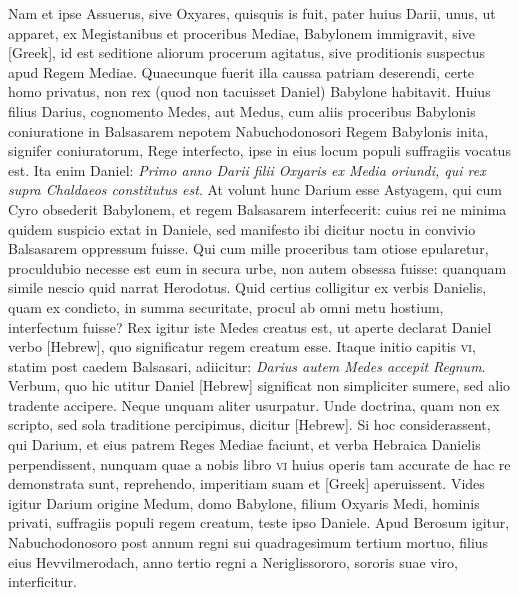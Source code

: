 Nam et ipse Assuerus,
sive Oxyares, quisquis is fuit, pater huius Darii, unus, ut apparet,
ex Megistanibus et proceribus Mediae, Babylonem immigravit,
sive \textgreek{[Greek]}, id est seditione aliorum procerum agitatus,
sive proditionis suspectus apud Regem Mediae.
Quaecunque fuerit
illa caussa patriam deserendi, certe homo privatus, non rex
(quod non tacuisset Daniel) Babylone habitavit.
Huius filius Darius,
cognomento Medes, aut Medus, cum aliis proceribus Babylonis
coniuratione in Balsasarem nepotem Nabuchodonosori Regem
Babylonis inita, signifer coniuratorum, Rege interfecto, ipse
in eius locum populi suffragiis vocatus est.
Ita enim Daniel: \textit{Primo
anno Darii filii Oxyaris ex Media oriundi, qui rex supra Chaldaeos
constitutus est}.
At volunt hunc Darium esse Astyagem, qui cum
Cyro obsederit Babylonem, et regem Balsasarem interfecerit: cuius
rei ne minima quidem suspicio extat in Daniele, sed manifesto
ibi dicitur noctu in convivio Balsasarem oppressum fuisse.
Qui
cum mille proceribus tam otiose epularetur, proculdubio necesse
est eum in secura urbe, non autem obsessa fuisse: quanquam simile
nescio quid narrat Herodotus.
Quid certius colligitur ex verbis
Danielis, quam ex condicto, in summa securitate, procul ab omni
metu hostium, interfectum fuisse?
Rex igitur iste Medes creatus
est, ut aperte declarat Daniel verbo
 \texthebrew{[Hebrew]}, quo significatur regem
creatum esse.
Itaque initio capitis \textsc{vi}, statim post caedem Balsasari,
adiicitur: \textit{Darius autem Medes accepit Regnum}.
Verbum,
quo hic utitur Daniel \texthebrew{[Hebrew]}
 significat non simpliciter sumere, sed
alio tradente accipere.
Neque unquam aliter usurpatur.
Unde doctrina,
quam non ex scripto, sed sola traditione percipimus, dicitur
\texthebrew{[Hebrew]}.
Si hoc considerassent, qui Darium, et eius patrem Reges
Mediae faciunt, et verba Hebraica Danielis perpendissent,
nunquam quae a nobis libro \textsc{vi} huius operis tam accurate de hac
re demonstrata sunt, reprehendo, imperitiam suam et \textgreek{[Greek]}
aperuissent.
Vides igitur Darium origine Medum, domo Babylone,
filium Oxyaris Medi, hominis privati, suffragiis populi regem
creatum, teste ipso Daniele.
{}
Apud Berosum igitur, Nabuchodonosoro
post annum regni sui quadragesimum tertium mortuo, filius
eius Hevvilmerodach, anno tertio regni a Neriglissororo, sororis
suae viro, interficitur.

